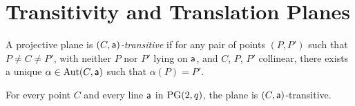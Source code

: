 \section{Transitivity and Translation Planes}

\begin{defn}
    A projective plane is \textsl{$(C,\mathsf{a})$-transitive} if for any pair of points $(P,P')$ such that $P \ne C \ne P'$, with neither $P$ nor $P'$ lying on $\mathsf{a}$, and $C$, $P$, $P'$ collinear, there exists a unique $\alpha \in \operatorname{Aut}(C,\mathsf{a})$ such that $\alpha(P) = P'$.
\end{defn}

\begin{thm}\label{thm:PG(2,q)-transitivity}
    For every point\/ $C$ and every line\/ $\mathsf a$ in\/ $\operatorname{PG}(2,q)$, the plane is\/ $(C,\mathsf a)$-transitive.
\end{thm}


